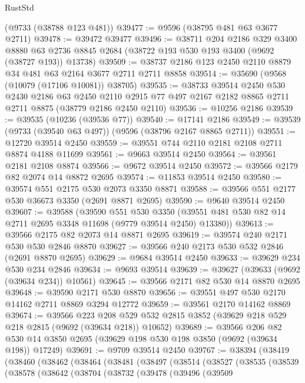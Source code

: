 \begin{lexlean}{RustStd}
\begin{coremodule}
    (@9733 (@38788 @123 @481))
@39477 := @9596 (@38795 @481 @63 @3677 @2711)
@39478 := @39472 @39477
@39496 := @38711
    @204
    @2186
    @329
    @3400
    @8880
    @63
    @2736
    @8845
    @2684
    (@38722 @193 @530 @193 @3400 (@9692 (@38727 @193)) @13738)
@39509 := @38737 @2186 @123 @2450 @2110 @8879 @34 @481 @63 @2164 @3677 @2711 @2711 @8858
@39514 := @35690 (@9568 (@10079 (@17106 @10081)) @38705)
@39535 := @38733
    @39514
    @2450
    @530
    @2430
    @2186
    @63
    @2450
    @2110
    @2915
    @77
    @497
    @2167
    @2182
    @8865
    @2711
    @2711
    @8875
    (@38779 @2186 @2450 @2110)
@39536 := @10256 @2186
@39539 := @39535 (@10236 (@39536 @77))
@39540 := @17141 @2186
@39549 := @39539 (@9733 (@39540 @63 @497)) (@9596 (@38796 @2167 @8865 @2711))
@39551 := @12720 @39514 @2450
@39559 := @39551 @744 @2110 @2181 @2108 @2711 @8874 @4188 @11699
@39561 := @9663 @39514 @2450
@39564 := @39561 @2181 @2108 @8874
@39566 := @9672 @39514 @2450
@39572 := @39566 @2179 @82 @2074 @14 @8872 @2695
@39574 := @11853 @39514 @2450
@39580 := @39574 @551 @2175 @530 @2073 @3350 @8871
@39588 := @39566 @551 @2177 @530 @36673 @3350 (@2691 @8871 @2695)
@39590 := @9640 @39514 @2450
@39607 := @39588
    (@39590
      @551
      @530
      @3350
      (@39551 @481 @530 @82 @14 @2711 @2695 @3348 @11698 (@9779 @39514 @2450) @13380))
@39613 := @39566 @2175 @82 @2073 @14 @8871 @2695
@39619 := @39574 @240 @2171 @530 @530 @2846 @8870
@39627 := @39566 @240 @2173 @530 @532 @2846 (@2691 @8870 @2695)
@39629 := @9684 @39514 @2450
@39633 := @39629 @234 @530 @234 @2846
@39634 := @9693 @39514
@39639 := @39627 (@39633 (@9692 (@39634 @234)) @10561)
@39645 := @39566 @2171 @82 @530 @14 @8870 @2695
@39648 := @39590 @2171 @530 @8870
@39656 := @39551 @497 @530 @2170 @14162 @2711 @8869 @3294 @12772
@39659 := @39561 @2170 @14162 @8869
@39674 := @39566
    @223
    @208
    @529
    @532
    @2815
    @3852
    (@39629 @218 @529 @218 @2815 (@9692 (@39634 @218)) @10652)
@39689 := @39566
    @206
    @82
    @530
    @14
    @3850
    @2695
    (@39629 @198 @530 @198 @3850 (@9692 (@39634 @198)) @17249)
@39691 := @9709 @39514 @2450
@39767 := @38394
    (@38419
      (@38460
        (@38462
          (@38464
            (@38481
              (@38497
                (@38514
                  (@38527
                    (@38535
                      (@38539
                        (@38578
                          (@38642
                            (@38704
                              (@38732
                                (@39478
                                  (@39496
                                    (@39509

\end{coremodule}
\end{lexlean}

